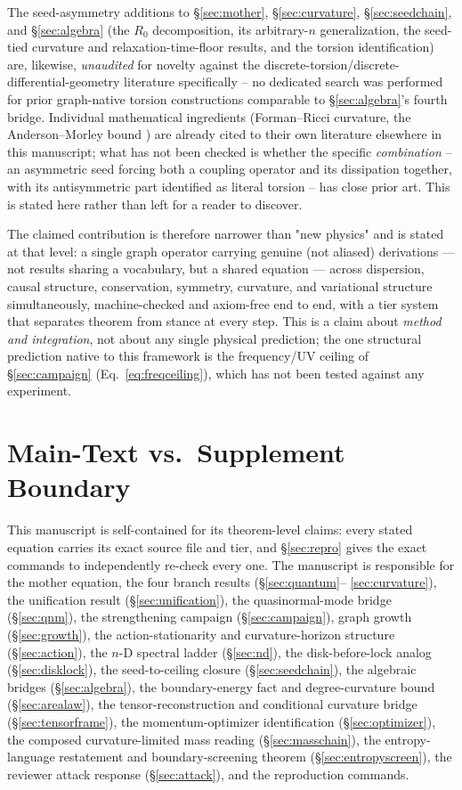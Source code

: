 \documentclass[10pt,twocolumn]{article}
\begin{document}
The seed-asymmetry additions to \S\ref{sec:mother}, \S\ref{sec:curvature}, \S\ref{sec:seedchain},
and \S\ref{sec:algebra} (the $R_0$ decomposition, its arbitrary-$n$ generalization, the seed-tied
curvature and relaxation-time-floor results, and the torsion identification) are, likewise,
\emph{unaudited} for novelty against the discrete-torsion/discrete-differential-geometry
literature specifically -- no dedicated search was performed for prior graph-native torsion
constructions comparable to \S\ref{sec:algebra}'s fourth bridge. Individual mathematical
ingredients (Forman--Ricci curvature, the Anderson--Morley bound \cite{andersonmorley1985}) are
already cited to their own literature elsewhere in this manuscript; what has not been checked is
whether the specific \emph{combination} -- an asymmetric seed forcing both a coupling operator and
its dissipation together, with its antisymmetric part identified as literal torsion -- has close
prior art. This is stated here rather than left for a reader to discover.

The claimed contribution is therefore narrower than "new physics" and is stated
at that level: a single graph operator carrying genuine (not aliased) derivations
--- not results sharing a vocabulary, but a shared equation --- across dispersion,
causal structure, conservation, symmetry, curvature, and variational structure
simultaneously, machine-checked and axiom-free end to end, with a tier system
that separates theorem from stance at every step. This is a claim about
\emph{method and integration}, not about any single physical prediction; the one
structural prediction native to this framework is the frequency/UV ceiling of
\S\ref{sec:campaign} (Eq.~\ref{eq:freqceiling}), which has not been tested against
any experiment.

\section{Main-Text vs.\ Supplement Boundary}
\label{sec:boundary}
This manuscript is self-contained for its theorem-level claims: every stated
equation carries its exact source file and tier, and \S\ref{sec:repro} gives the
exact commands to independently re-check every one. The manuscript is responsible
for the mother equation, the four branch results (\S\ref{sec:quantum}--
\ref{sec:curvature}), the unification result (\S\ref{sec:unification}), the
quasinormal-mode bridge (\S\ref{sec:qnm}), the strengthening campaign
(\S\ref{sec:campaign}), graph growth (\S\ref{sec:growth}), the action-stationarity
and curvature-horizon structure (\S\ref{sec:action}), the $n$-D spectral ladder
(\S\ref{sec:nd}), the disk-before-lock analog (\S\ref{sec:disklock}), the
seed-to-ceiling closure (\S\ref{sec:seedchain}), the algebraic bridges
(\S\ref{sec:algebra}), the boundary-energy fact and degree-curvature bound
(\S\ref{sec:arealaw}), the tensor-reconstruction and conditional curvature
bridge (\S\ref{sec:tensorframe}), the momentum-optimizer identification
(\S\ref{sec:optimizer}), the composed curvature-limited mass reading
(\S\ref{sec:masschain}), the entropy-language restatement and
boundary-screening theorem (\S\ref{sec:entropyscreen}), the reviewer attack
response (\S\ref{sec:attack}), and the reproduction commands.
\end{document}
